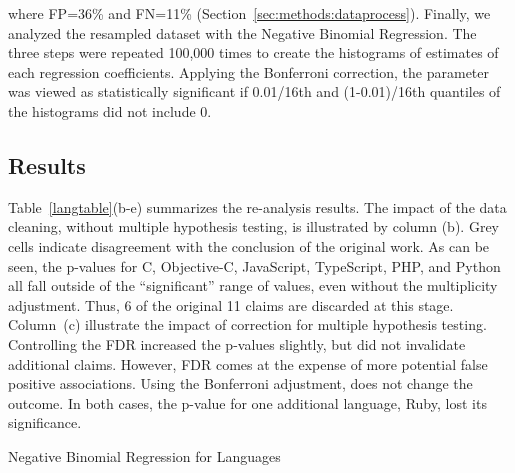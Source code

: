 \documentclass[acmsmall]{acmart}
\renewcommand{\c}{{\sf  C}\xspace}
\newcommand{\objc}{{\sf  Objective-C}\xspace}
\newcommand{\python}{{\sf  Python}\xspace}
\newcommand{\ruby}{{\sf  Ruby}\xspace}
\newcommand{\ts}{{\sf  TypeScript}\xspace}
\newcommand{\js}{{\sf  JavaScript}\xspace}
\newcommand{\php}{{\sf  PHP}\xspace}
\begin{document}
\vspace{-5mm}

\noindent where FP=36\% and FN=11\% (Section~\ref{sec:methods:dataprocess}).
Finally, we analyzed the resampled dataset with the Negative Binomial
Regression. The three steps were repeated 100,000 times to create the
histograms of estimates of each regression coefficients. Applying the
Bonferroni correction, the parameter was viewed as statistically significant
if 0.01/16th and (1-0.01)/16th quantiles of the histograms did not include  0.


\subsection{Results}

Table~\ref{langtable}(b-e) summarizes the re-analysis results. The impact of
the data cleaning, without multiple hypothesis testing, is illustrated by
column (b). Grey cells indicate disagreement with the conclusion of the
original work. As can be seen, the p-values for \c, \objc, \js, \ts, \php,
and \python all fall outside of the ``significant'' range of values, even
without the multiplicity adjustment. Thus, 6 of the original 11 claims are
discarded at this stage.  Column~(c) illustrate the impact of correction
for multiple hypothesis testing. Controlling the FDR increased the p-values
slightly, but did not invalidate additional claims. However, FDR comes at
the expense of more potential false positive associations. Using the
Bonferroni adjustment, does not change the outcome.  In both cases, the
p-value for one additional language, \ruby, lost its significance.

\begin{table}[h]\begin{minipage}[t]{\textwidth}{\centering
\caption{Negative Binomial Regression for Languages}
\renewcommand{\G}{\cellcolor{gray!25}}
\label{langtable}}
\end{minipage}\end{table}
\end{document}
